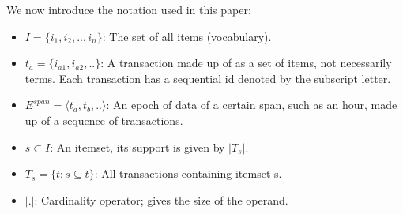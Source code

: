 \documentclass{sig-alternate}
\begin{document}


We now introduce the notation used in this paper:

\begin{itemize}
\item $I = \{i_1,i_2,..,i_n\}$: The set of all items (vocabulary).
\item $t_a = \{i_{a1},i_{a2},..\}$: A transaction made up of as a set of items, not necessarily terms. Each transaction has a sequential id denoted by the subscript letter.
\item $E^{span} = \langle t_a, t_b, ..\rangle$: An epoch of data of a certain span, such as an hour, made up of a sequence of transactions.
\item $s \subset I$: An itemset, its support is given by $|T_s|$.
\item $T_s = \{t: s \subseteq t\}$: All transactions containing itemset s.
\item $|.|$: Cardinality operator; gives the size of the operand.

\end{itemize}
\end{document}
